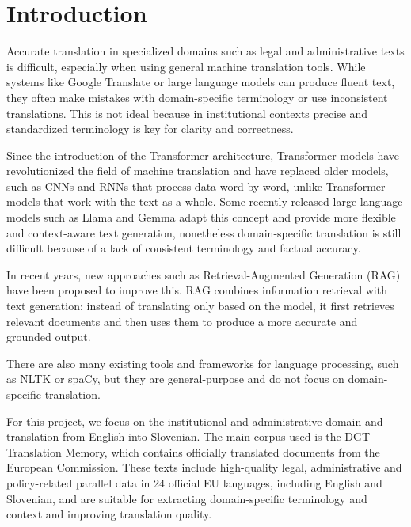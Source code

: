 \documentclass[fleqn,moreauthors,10pt]{ds_report}
\affiliation{\textit{Advisors: Aleš Žagar}}
\begin{document}
\flushbottom 

\maketitle 

\thispagestyle{empty} 


\section*{Introduction}

Accurate translation in specialized domains such as legal and administrative texts is difficult, especially when using general machine translation tools. While systems like Google Translate or large language models can produce fluent text, they often make mistakes with domain-specific terminology or use inconsistent translations. This is not ideal because in institutional contexts precise and standardized terminology is key for clarity and correctness. 

Since the introduction of the Transformer architecture, Transformer models have revolutionized the field of machine translation and have replaced older models, such as CNNs and RNNs that process data word by word, unlike Transformer models that work with the text as a whole. Some recently released large language models such as Llama and Gemma adapt this concept and provide more flexible and context-aware text generation, nonetheless domain-specific translation is still difficult because of a lack of consistent terminology and factual accuracy. 

In recent years, new approaches such as Retrieval-Augmented Generation (RAG) have been proposed to improve this. RAG combines information retrieval with text generation: instead of translating only based on the model, it first retrieves relevant documents and then uses them to produce a more accurate and grounded output.  

There are also many existing tools and frameworks for language processing, such as NLTK or spaCy, but they are general-purpose and do not focus on domain-specific translation.  

For this project, we focus on the institutional and administrative domain and translation from English into Slovenian. The main corpus used is the DGT Translation Memory, which contains officially translated documents from the European Commission. These texts include high-quality legal, administrative and policy-related parallel data in 24 official EU languages, including English and Slovenian, and are suitable for extracting domain-specific terminology and context and improving translation quality.  
\end{document}

